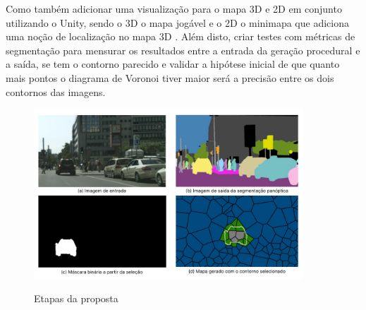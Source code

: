 Como também adicionar uma visualização para o mapa 3D e 2D em conjunto utilizando o Unity, sendo o 3D o mapa jogável e o 2D o minimapa que adiciona uma noção de localização no mapa 3D \cite{amitp2010,firstPersonMovement}. Além disto, criar testes com métricas de segmentação para mensurar os resultados entre a entrada da geração procedural e a saída, se tem o contorno parecido e validar a hipótese inicial de que quanto mais pontos o diagrama de Voronoi tiver maior será a precisão entre os dois contornos das imagens.

%




\begin{figure}[!ht]
	\centering
    \caption{Etapas da proposta}
	\includegraphics[width=0.9\textwidth]{figures/etapas_proposta.png}
	\label{fig:etapas_proposta}
\end{figure}



